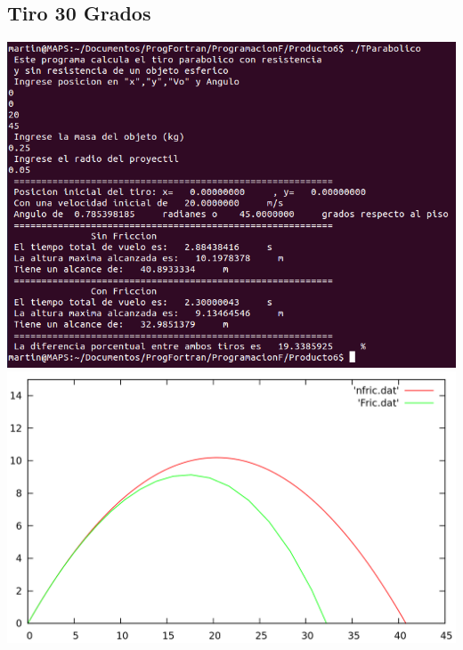 \documentclass[12pt]{article}
\begin{document}
\subsection{Tiro 30 Grados}
\begin{center}
\includegraphics[width=15cm]{Tiro45g20v.png}
\includegraphics[width=15cm]{Tiro45g.png}
\end{center}
\end{document}
